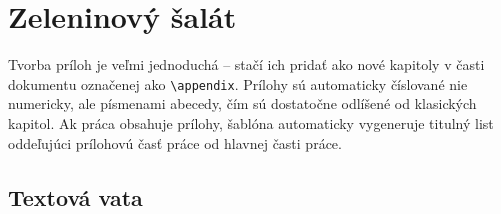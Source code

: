 
\chapter{Zeleninový šalát}

Tvorba príloh je veľmi jednoduchá -- stačí ich pridať ako nové kapitoly v časti dokumentu označenej ako \texttt{{\textbackslash}appendix}. Prílohy sú automaticky číslované nie numericky, ale písmenami abecedy, čím sú dostatočne odlíšené od klasických kapitol. Ak práca obsahuje prílohy, šablóna automaticky vygeneruje titulný list oddeľujúci prílohovú časť práce od hlavnej časti práce.

\section{Textová vata}



\Blindtext

